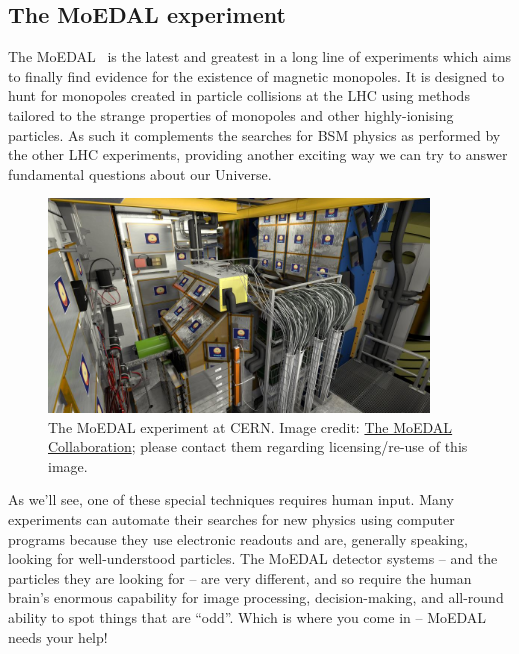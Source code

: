 \subsection{The MoEDAL experiment}
\label{sec:moedalintro}
The \acf{MoEDAL}~\cite{MoEDAL2009}
is the latest and greatest in a long line of experiments which aims to
finally find evidence for the existence of magnetic monopoles.
%
It is designed to hunt for monopoles created in particle collisions
at the LHC using methods tailored to the strange properties of monopoles
and other highly-ionising particles.
As such it complements the searches for \ac{BSM} physics as performed by
the other LHC experiments,
providing another exciting way we can try to answer fundamental questions 
about our Universe.

%
\begin{figure}[htbp]
  \centering
  \includegraphics[width=0.9\textwidth]{assets/images/moedal-photo/moedal-photo.jpg}
  \caption[The MoEDAL experiment at CERN]
  {\label{fig:moedalphoto}The MoEDAL experiment at CERN.
Image credit: \href{http://moedal.web.cern.ch/}{The MoEDAL Collaboration};
please contact them regarding licensing/re-use of this image.}
\end{figure}
%

As we'll see,
one of these special techniques requires human input.
Many experiments can automate their searches for new physics using computer
programs because they use electronic readouts and are, generally speaking,
looking for well-understood particles.
%
The MoEDAL detector systems -- and the particles they are
looking for -- are very different,
and so require the human brain's enormous capability for image processing,
decision-making, and all-round ability to spot things that are ``odd''.
Which is where you come in -- MoEDAL needs your help!


